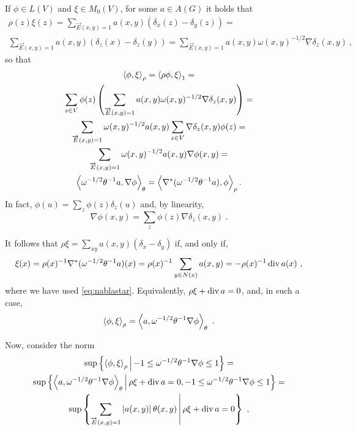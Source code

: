 \documentclass[12pt,a4paper]{amsart}
\theoremstyle{definition}
\begin{document}
If $\phi \in L(V)$ and $\xi \in M_0(V)$, for some $a \in A(G)$ it
holds that
\begin{multline*}
  \rho(z)\xi(z) =
  \sum_{\overrightarrow E(x,y)=1} a(x,y) (\delta_x(z) - \delta_y(z)) = \\
  \sum_{\overrightarrow E(x,y)=1} a(x,y) (\delta_z(x) - \delta_z(y)) =
  \sum_{\overrightarrow E(x,y)=1} a(x,y) \omega(x,y)^{-1/2} \nabla
  \delta_z (x,y) \ ,
\end{multline*}
so that
\begin{multline*}
  \left\langle\phi,\xi\right\rangle_{\rho} = \left\langle\rho\phi,\xi\right\rangle_{1} = \\ \sum_{z \in V} \phi(z)
  \left(\sum_{\overrightarrow E(x,y)=1}
    a(x,y) \omega(x,y)^{-1/2} \nabla \delta_z (x,y)\right) = \\
  \sum_{\overrightarrow E(x,y)=1} \omega(x,y) ^{-1/2} a(x,y) \sum_{z
    \in V} \nabla \delta_z (x,y) \phi(z) = \\
  \sum_{\overrightarrow E(x,y)=1} \omega(x,y) ^{-1/2} a(x,y) \nabla
  \phi (x,y) = \\ \left\langle\omega^{-1/2}\theta^{-1} a,\nabla \phi\right\rangle_{\theta} = \left\langle\nabla^* (\omega^{-1/2} \theta^{-1} a),\phi\right\rangle_{\rho} .
\end{multline*}
In fact, $\phi(u) = \sum_z \phi (z) \delta_z(u)$ and,
by linearity,
\begin{equation*}
 \nabla \phi (x,y) = \sum_z \phi(z)
\nabla \delta_z(x,y) \ .
\end{equation*}

It follows that $\rho \xi = \sum_{xy} a(x,y) (\delta_x-\delta_y)$ if, and
only if,
\begin{equation*}
  \xi(x) = \rho(x)^{-1} \nabla^* (\omega^{-1/2} \theta^{-1} a) (x) = \rho(x)^{-1} \sum_{y
    \in N(x)}  a(x,y) = - \rho(x)^{-1} \operatorname*{div} a (x) \ , 
\end{equation*}
where we have used \cref{eq:nablastar}. 
Equivalently, $\rho \xi + \operatorname*{div} a = 0$, and, in such a case,
\begin{equation*}
  \left\langle\phi,\xi\right\rangle_{\rho} = \left\langle a,\omega^{-1/2} \theta^{-1} \nabla
    \phi\right\rangle_{\theta} \ .
\end{equation*}

Now, consider the norm
\begin{multline*}
 \sup\left\{\left\langle\phi,\xi\right\rangle_{\rho} \, \middle| \, -1 \leq \omega^{-1/2} \theta^{-1} \nabla
    \phi \leq 1 \right\} = \\ \sup\left\{\left\langle a,\omega^{-1/2} \theta^{-1} \nabla
    \phi \right\rangle_{\theta} \, \middle| \, \rho \xi + \operatorname*{div} a = 0,
    -1 \leq \omega^{-1/2} \theta^{-1} \nabla
    \phi \leq 1 \right\} = \\
  \sup\left\{\sum_{\overrightarrow E(x,y) = 1} \left\vert a(x,y)\right\vert \theta(x,y) \, \middle| \, \rho \xi + \operatorname*{div} a = 0 \right\} \ ,
\end{multline*}
\end{document}
